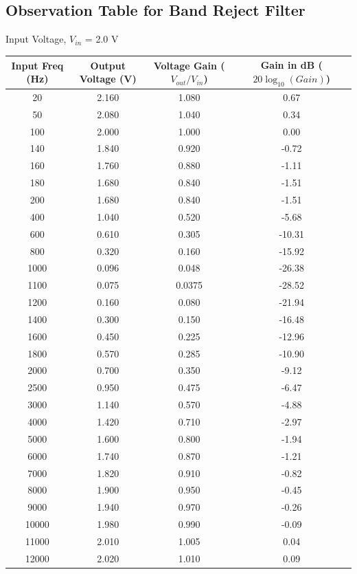 \documentclass[12pt,a4paper]{article}
\begin{document}
\subsection{Observation Table for Band Reject Filter}
Input Voltage, $V_{in}$ = 2.0 V \\
\begin{table}[H]
\centering
\begin{tabular}{|c|c|c|c|}
\hline
\textbf{Input Freq (Hz)} & \textbf{Output Voltage (V)} & \textbf{Voltage Gain ($V_{out}/V_{in}$)} & \textbf{Gain in dB ($20\log_{10}(Gain)$)} \\
\hline
20 & 2.160 & 1.080 & 0.67 \\
50 & 2.080 & 1.040 & 0.34 \\
100 & 2.000 & 1.000 & 0.00 \\
140 & 1.840 & 0.920 & -0.72 \\
160 & 1.760 & 0.880 & -1.11 \\
180 & 1.680 & 0.840 & -1.51 \\
200 & 1.680 & 0.840 & -1.51 \\
400 & 1.040 & 0.520 & -5.68 \\
600 & 0.610 & 0.305 & -10.31 \\
800 & 0.320 & 0.160 & -15.92 \\
1000 & 0.096 & 0.048 & -26.38 \\
1100 & 0.075 & 0.0375 & -28.52 \\
1200 & 0.160 & 0.080 & -21.94 \\
1400 & 0.300 & 0.150 & -16.48 \\
1600 & 0.450 & 0.225 & -12.96 \\
1800 & 0.570 & 0.285 & -10.90 \\
2000 & 0.700 & 0.350 & -9.12 \\
2500 & 0.950 & 0.475 & -6.47 \\
3000 & 1.140 & 0.570 & -4.88 \\
4000 & 1.420 & 0.710 & -2.97 \\
5000 & 1.600 & 0.800 & -1.94 \\
6000 & 1.740 & 0.870 & -1.21 \\
7000 & 1.820 & 0.910 & -0.82 \\
8000 & 1.900 & 0.950 & -0.45 \\
9000 & 1.940 & 0.970 & -0.26 \\
10000 & 1.980 & 0.990 & -0.09 \\
11000 & 2.010 & 1.005 & 0.04 \\
12000 & 2.020 & 1.010 & 0.09 \\

\end{tabular}
\end{table}
\end{document}
